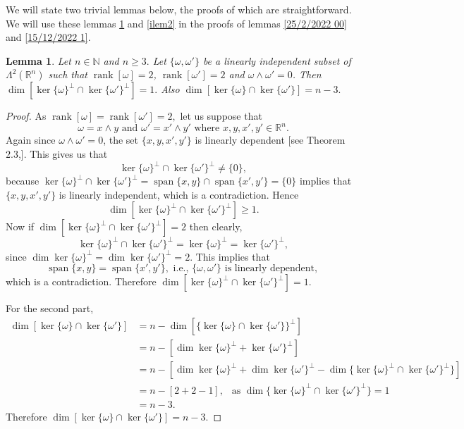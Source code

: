 \documentclass[11pt, a4paper, reqno]{amsart}
\numberwithin{equation}{section}
\newcommand{\spann}{\operatorname{span}}
\newcommand{\rank}{\operatorname{rank}}
\newtheorem{lemma}[theorem]{Lemma}
\begin{document}
We will state two trivial lemmas below, the proofs of which are straightforward. We will use these lemmas \ref{ilem} and \ref{ilem2} in the proofs of lemmas \ref{25/2/2022 00} and \ref{15/12/2022 1}. 
\begin{lemma}\label{ilem}
 Let $n\in \mathbb N$ and $n\geq 3.$ Let $\{\omega,\omega'\}$ be a linearly independent subset of $\Lambda^2(\mathbb R^n)$ such that $\rank[\omega]=2$, $\rank[\omega']=2$ and $\omega \wedge \omega'=0$. Then $\dim[\ker\{\omega\}^{\perp} \cap \ker\{\omega'\}^{\perp}]=1.$  Also $\dim [\ker\{\omega\}\cap \ker \{\omega'\}]=n-3.$
\end{lemma}
\begin{proof}
As $\rank[\omega]=\rank [\omega']=2, $ let us suppose that $$\omega=x\wedge y\textrm{ and }\omega'=x'\wedge y'\textrm{ where } x,y,x',y'\in \mathbb R^n.$$
Again since $\omega\wedge \omega'=0$, the set  $\{x,y,x',y'\}$ is linearly dependent [see Theorem $2.3$,\cite{csato2011pullback}]. This gives us that $$\ker\{\omega\}^{\perp}\cap \ker \{\omega'\}^{\perp}\neq \{0\},$$
because $\ker\{\omega\}^{\perp}\cap \ker \{\omega'\}^{\perp}=\spann \{x,y\}\cap \spann \{x',y'\} =\{0\}$ implies that $\{x,y,x',y'\}$ is linearly independent, which is a contradiction. Hence $$\dim [\ker \{\omega\}^{\perp}\cap \ker \{\omega'\}^{\perp}]\geq 1.$$
Now if $\dim [\ker \{\omega\}^{\perp}\cap \ker \{\omega'\}^{\perp}]=2$ then clearly, $$\ker \{\omega\}^{\perp}\cap \ker \{\omega'\}^{\perp}=\ker \{\omega\}^{\perp}=\ker \{\omega'\}^{\perp},$$
since $\dim \ker\{\omega\}^{\perp}=\dim \ker \{\omega'\}^{\perp}=2.$ This implies that $$\spann \{x,y\}=\spann \{x',y'\},\textrm{ i.e., } \{\omega,\omega'\}\textrm{ is linearly dependent, }$$
which is a contradiction. Therefore $\dim [\ker \{\omega\}^{\perp}\cap \ker \{\omega'\}^{\perp}]=1.$

For the second part, 
\begin{align*}
    \dim [\ker \{\omega\}\cap \ker \{\omega'\}] &=n-\dim [\{\ker \{\omega\}\cap \ker \{\omega'\}\}^{\perp}]\\
    &=n-[\dim \ker\{\omega\}^{\perp}+ \ker\{\omega'\}^{\perp}]\\
    &=n-[\dim \ker\{\omega\}^{\perp}+\dim \ker\{\omega'\}^{\perp}-\dim \{\ker\{\omega\}^{\perp}\cap \ker\{\omega'\}^{\perp}\}]\\
    &=n-[2+2-1], \ \ \textrm{ as } \dim \{\ker\{\omega\}^{\perp}\cap \ker\{\omega'\}^{\perp}\}=1 \\
    &=n-3.
\end{align*}
Therefore $\dim [\ker \{\omega\}\cap \ker \{\omega'\}]=n-3.$
\end{proof}
\end{document}
